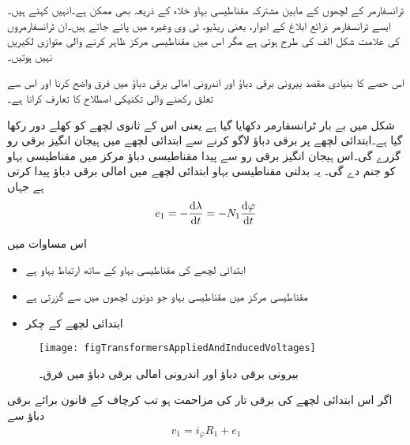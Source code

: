 ٹرانسفارمر کے لچھوں کے مابین مشترکہ مقناطیسی بہاو خلاء کے ذریعہ بھی ممکن ہے۔انہیں   کہتے ہیں۔ ایسے ٹرانسفارمر ذرائع ابلاغ کے ادوار، یعنی ریڈیو، ٹی وی وغیرہ میں پائے جاتے ہیں۔ان ٹرانسفارمروں کی علامت  شکل  الف کی طرح ہوتی ہے مگر اس میں مقناطیسی مرکز ظاہر کرنے والی متوازی لکیریں نہیں ہوتیں۔

اس حصے کا بنیادی مقصد بیرونی برقی دباؤ   اور اندرونی امالی برقی دباؤ   میں فرق واضح کرنا اور اس سے تعلق رکھنے والی تکنیکی اصطلاح کا تعارف کرانا ہے۔

شکل   میں بے بار ٹرانسفارمر دکھایا گیا ہے یعنی اس کے ثانوی لچھے کو کھلے دور رکھا گیا ہے۔ابتدائی لچھے پر  برقی دباؤ لاگو کرنے سے ابتدائی لچھے میں ہیجان انگیز برقی رو  گزرے گی۔اس ہیجان انگیز برقی رو سے پیدا مقناطیسی دباؤ   مرکز میں مقناطیسی بہاو   کو جنم دے گی۔ یہ بدلتی مقناطیسی بہاو ابتدائی لچھے میں امالی برقی  دباؤ   پیدا کرتی ہے جہاں
\begin{align}
e_1=-\frac{\dif \lambda}{\dif t}=-N_1 \frac{\dif \varphi}{\dif t}
\end{align}

 اس مساوات میں
\begin{itemize}
\item
{} ابتدائی لچھے کی مقناطیسی بہاو کے ساتھ ارتباط بہاو ہے
\item
{} مقناطیسی مرکز میں مقناطیسی بہاو جو دونوں لچھوں میں سے گزرتی ہے
\item
{} ابتدائی لچھے کے چکر
\end{itemize}
%
\begin{figure}
\centering
\texttt{[image: figTransformersAppliedAndInducedVoltages]}
\caption{بیرونی برقی دباؤ اور اندرونی امالی برقی دباؤ میں فرق۔}
\label{شکل_ٹرانسفارمر_بیرونی_اور_اندرونی_برقی_دباؤ}
\end{figure}

اگر اس ابتدائی لچھے کی برقی تار کی مزاحمت  ہو تب کرچاف کے قانون برائے برقی دباؤ سے
\begin{align}\label{مساوات_ٹرانسفارمر_بیرونی_اندرونی_دباؤ_فرق}
v_1 = i_{\varphi} R_1+e_1
\end{align}

